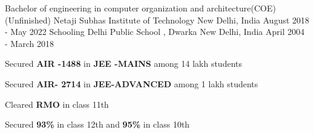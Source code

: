 
\begin{cventries}
  \cventry
    {Bachelor of engineering in computer organization and architecture(COE) (Unfinished)} %
    {Netaji Subhas Institute of Technology} %
    {New Delhi, India} %
    {August 2018 - May 2022} %
    {}
  \cventry
    {Schooling} %
    {Delhi Public School , Dwarka} %
    {New Delhi, India} %
    {April 2004 - March 2018} %
    {
    \begin{cvitems} %
        \item {Secured \textbf{AIR -1488}  in \textbf{JEE -MAINS} among 14 lakh students}
        \item {Secured \textbf{AIR- 2714}  in \textbf{JEE-ADVANCED} among 1 lakh students}
        \item {Cleared \textbf{RMO} in class 11th }
        \item{Secured \textbf{93\% } in class 12th and \textbf{95\% }in class 10th}
     \end{cvitems}
    }
    
    
\end{cventries}
